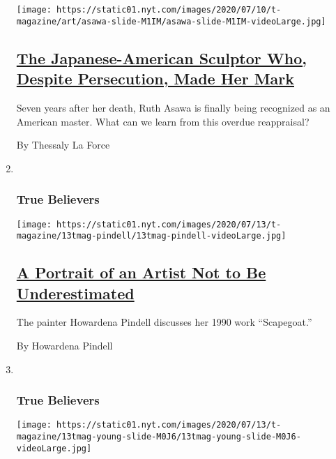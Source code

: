 \begin{enumerate}
  \texttt{[image: https://static01.nyt.com/images/2020/07/10/t-magazine/art/asawa-slide-M1IM/asawa-slide-M1IM-videoLarge.jpg]}

  \hypertarget{the-japanese-american-sculptor-who-despite-persecution-made-her-mark}{%
  \subsection{\texorpdfstring{\href{/2020/07/20/t-magazine/ruth-asawa.html}{The
  Japanese-American Sculptor Who, Despite Persecution, Made Her
  Mark}}{The Japanese-American Sculptor Who, Despite Persecution, Made Her Mark}}\label{the-japanese-american-sculptor-who-despite-persecution-made-her-mark}}

  Seven years after her death, Ruth Asawa is finally being recognized as
  an American master. What can we learn from this overdue reappraisal?

  By Thessaly La Force
\item ~
  \hypertarget{true-believers-2}{%
  \subsubsection{True Believers}\label{true-believers-2}}

  \texttt{[image: https://static01.nyt.com/images/2020/07/13/t-magazine/13tmag-pindell/13tmag-pindell-videoLarge.jpg]}

  \hypertarget{a-portrait-of-an-artist-not-to-be-underestimated}{%
  \subsection{\texorpdfstring{\href{/2020/07/24/t-magazine/howardena-pindell.html}{A
  Portrait of an Artist Not to Be
  Underestimated}}{A Portrait of an Artist Not to Be Underestimated}}\label{a-portrait-of-an-artist-not-to-be-underestimated}}

  The painter Howardena Pindell discusses her 1990 work ``Scapegoat.''

  By Howardena Pindell
\item ~
  \hypertarget{true-believers-3}{%
  \subsubsection{True Believers}\label{true-believers-3}}

  \texttt{[image: https://static01.nyt.com/images/2020/07/13/t-magazine/13tmag-young-slide-M0J6/13tmag-young-slide-M0J6-videoLarge.jpg]}


\end{enumerate}

